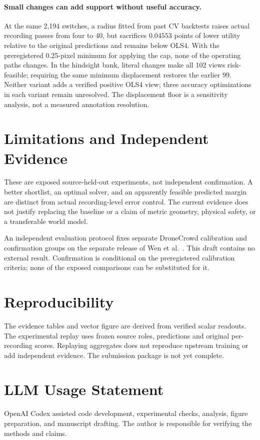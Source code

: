 \documentclass[10pt,twocolumn,letterpaper]{article}
\begin{document}
\paragraph{Small changes can add support without useful accuracy.}
At the same 2,194 switches, a radius fitted from past CV backtests
raises actual recording passes from four to 40, but sacrifices
$0.04553$ points of lower utility relative to the original
predictions and remains below OLS4. With the preregistered
0.25-pixel minimum for applying the cap, none of the operating
paths changes. In the hindsight bank, literal changes make all
102 views risk-feasible; requiring the same minimum displacement
restores the earlier 99. Neither variant adds a verified positive
OLS4 view; three accuracy optimizations in each variant remain
unresolved. The displacement floor is a sensitivity analysis,
not a measured annotation resolution.

\section{Limitations and Independent Evidence}
These are exposed source-held-out experiments, not independent
confirmation. A better shortlist, an optimal solver, and an
apparently feasible predicted margin are distinct from actual
recording-level error control. The current evidence does not
justify replacing the baseline or a claim of metric geometry,
physical safety, or a transferable world model.

An independent evaluation protocol fixes separate DroneCrowd
calibration and confirmation groups on the separate release
of Wen et al.~\cite{wen}. This draft contains no
external result. Confirmation is conditional on the preregistered
calibration criteria; none of the exposed comparisons can be
substituted for it.

\section{Reproducibility}
The evidence tables and vector figure are derived from verified
scalar readouts. The experimental replay uses frozen source roles,
predictions and original per-recording scores. Replaying aggregates
does not reproduce upstream training or add independent evidence.
The submission package is not yet complete.

\section*{LLM Usage Statement}
OpenAI Codex assisted code development, experimental checks,
analysis, figure preparation, and manuscript drafting. The author
is responsible for verifying the methods and claims.
\end{document}
